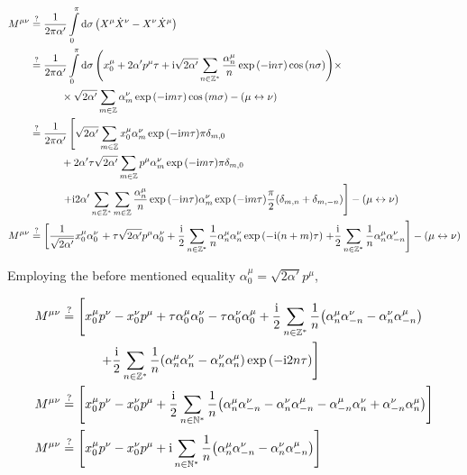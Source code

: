 \begin{align*}
    M^{\mu\nu}&\stackrel{?}{=}\frac{1}{2\pi\alpha'}\int\limits_0^\pi\dd{\sigma}\qty(X^\mu{\dot X}^\nu-X^\nu{\dot X}^\mu)\\
    &\stackrel{?}{=}\frac{1}{2\pi\alpha'}\int\limits_0^\pi\dd{\sigma}\qty(x_0^\mu+2\alpha'p^\mu\tau+\textnormal{i}\sqrt{2\alpha'}\sum\limits_{n\in\mathbb Z^\ast}\frac{\alpha^\mu_n}{n}\exp\qty(-\textnormal{i} n\tau)\cos\qty(n\sigma))\times\\
    &\quad\quad\quad\times\sqrt{2\alpha'}\sum\limits_{m\in\mathbb Z}\alpha^\nu_m\exp\qty(-\textnormal{i} m\tau)\cos\qty(m\sigma)-\qty(\mu\leftrightarrow\nu)\\
    &\stackrel{?}{=}\frac{1}{2\pi\alpha'}\left[\sqrt{2\alpha'}\sum\limits_{m\in\mathbb Z}x_0^\mu\alpha^\nu_m\exp\qty(-\textnormal{i} m\tau)\pi\delta_{m,0}\right.\\
    &\quad\quad\quad+2\alpha'\tau\sqrt{2\alpha'}\sum\limits_{m\in\mathbb Z}p^\mu\alpha^\nu_m\exp\qty(-\textnormal{i} m\tau)\pi\delta_{m,0}\\
    &\quad\quad\quad\left.+\textnormal{i} 2\alpha'\sum\limits_{n\in\mathbb Z^\ast}\sum\limits_{m\in\mathbb Z}\frac{\alpha^\mu_n}{n}\exp\qty(-\textnormal{i} n\tau)\alpha^\nu_m\exp\qty(-\textnormal{i} m\tau)\frac\pi2\qty(\delta_{m,n}+\delta_{m,-n})\right]-\qty(\mu\leftrightarrow\nu)\\
    M^{\mu\nu}&\stackrel{?}{=}\left[\frac{1}{\sqrt{2\alpha'}}x_0^\mu\alpha^\nu_0\right.+\tau\sqrt{2\alpha'}p^\mu\alpha^\nu_0+\frac{\textnormal{i}}2 \sum\limits_{n\in\mathbb Z^\ast}\frac{1}{n}\alpha^\mu_n\alpha^\nu_n\exp\qty(-\textnormal{i} \qty(n+m)\tau)\left.+\frac{\textnormal{i}}2\sum\limits_{n\in\mathbb Z^\ast}\frac{1}{n}\alpha^\mu_n\alpha^\nu_{-n}\right]-\qty(\mu\leftrightarrow\nu)
\end{align*}

Employing the before mentioned equality $\alpha^\mu_0=\sqrt{2\alpha'}p^\mu$,

\begin{align*}
    M^{\mu\nu}&\stackrel{?}{=}\left[x_0^\mu p^\nu-x_0^\nu p^\mu+\tau\alpha_0^\mu \alpha_0^\nu-\tau\alpha_0^\nu \alpha_0^\mu+\frac{\textnormal{i}}2\sum\limits_{n\in\mathbb Z^\ast}\frac{1}{n}\qty(\alpha^\mu_n\alpha^\nu_{-n}-\alpha^\nu_n\alpha^\mu_{-n})\right.\\
    &\quad\quad\quad\left.+\frac{\textnormal{i}}2 \sum\limits_{n\in\mathbb Z^\ast}\frac{1}{n}\qty(\alpha^\mu_n\alpha^\nu_n-\alpha^\nu_n\alpha^\mu_n)\exp\qty(-\textnormal{i} 2n\tau)\right]\\
    M^{\mu\nu}&\stackrel{?}{=}\left[x_0^\mu p^\nu-x_0^\nu p^\mu+\frac{\textnormal{i}}2\sum\limits_{n\in\mathbb N^\ast}\frac{1}{n}\qty(\alpha^\mu_n\alpha^\nu_{-n}-\alpha^\nu_n\alpha^\mu_{-n}-\alpha^\mu_{-n}\alpha^\nu_{n}+\alpha^\nu_{-n}\alpha^\mu_{n})\right]\\
    M^{\mu\nu}&\stackrel{?}{=}\left[x_0^\mu p^\nu-x_0^\nu p^\mu+\textnormal{i}\sum\limits_{n\in\mathbb N^\ast}\frac{1}{n}\qty(\alpha^\mu_n\alpha^\nu_{-n}-\alpha^\nu_n\alpha^\mu_{-n})\right]
\end{align*}

